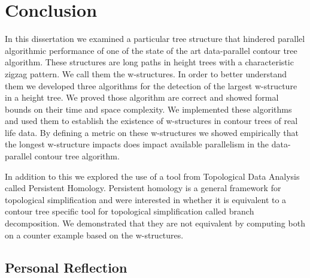 \chapter{Conclusion}
\label{chapter8}

In this dissertation we examined a particular tree structure that hindered parallel algorithmic performance of one of the state of the art data-parallel contour tree algorithm. These structures are long paths in height trees with a characteristic zigzag pattern. We call them the w-structures. In order to better understand them we developed three algorithms for the detection of the largest w-structure in a height tree. We proved those algorithm are correct and showed formal bounds on their time and space complexity. We implemented these algorithms and used them to establish the existence of w-structures in contour trees of real life data. By defining a metric on these w-structures we showed empirically that the longest w-structure impacts does impact available parallelism in the data-parallel contour tree algorithm.

In addition to this we explored the use of a tool from Topological Data Analysis called Persistent Homology. Persistent homology is a general framework for topological simplification and were interested in whether it is equivalent to a contour tree specific tool for topological simplification called branch decomposition. We demonstrated that they are not equivalent by computing both on a counter example based on the w-structures.





\section{Personal Reflection}

